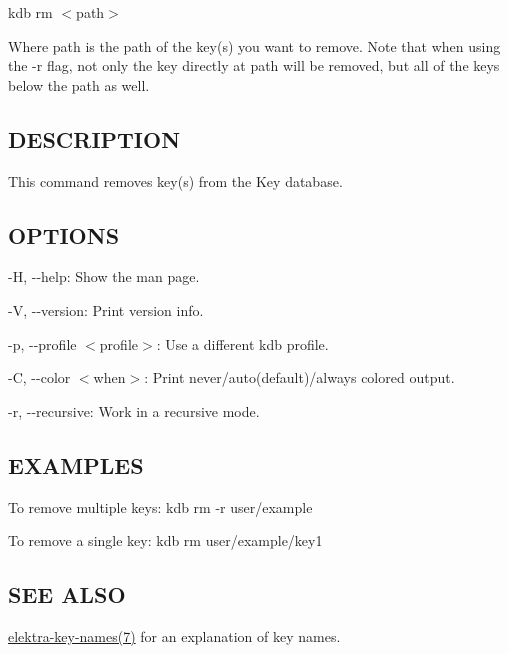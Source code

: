 {\ttfamily kdb rm $<$path$>$}

Where {\ttfamily path} is the path of the key(s) you want to remove. Note that when using the {\ttfamily -\/r} flag, not only the key directly at {\ttfamily path} will be removed, but all of the keys below the path as well.

\subsection*{D\+E\+S\+C\+R\+I\+P\+T\+I\+ON}

This command removes key(s) from the Key database.

\subsection*{O\+P\+T\+I\+O\+NS}


\begin{DoxyItemize}
\item {\ttfamily -\/H}, {\ttfamily -\/-\/help}\+: Show the man page.
\item {\ttfamily -\/V}, {\ttfamily -\/-\/version}\+: Print version info.
\item {\ttfamily -\/p}, {\ttfamily -\/-\/profile $<$profile$>$}\+: Use a different kdb profile.
\item {\ttfamily -\/C}, {\ttfamily -\/-\/color $<$when$>$}\+: Print never/auto(default)/always colored output.
\item {\ttfamily -\/r}, {\ttfamily -\/-\/recursive}\+: Work in a recursive mode.
\end{DoxyItemize}

\subsection*{E\+X\+A\+M\+P\+L\+ES}

To remove multiple keys\+: {\ttfamily kdb rm -\/r user/example}

To remove a single key\+: {\ttfamily kdb rm user/example/key1}

\subsection*{S\+EE A\+L\+SO}


\begin{DoxyItemize}
\item \hyperlink{md_doc_help_elektra-key-names_doc_help_elektra-key-names_md}{elektra-\/key-\/names(7)} for an explanation of key names. 
\end{DoxyItemize}